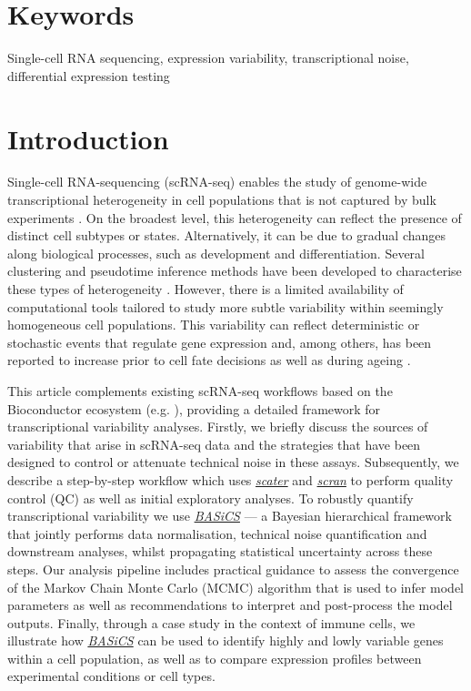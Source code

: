\documentclass[9pt,a4paper,]{extarticle}
\begin{document}
\section*{Keywords}
Single-cell RNA sequencing, expression variability, transcriptional noise, differential expression testing


\clearpage
\pagestyle{main}

\hypertarget{introduction}{%
\section{Introduction}\label{introduction}}

Single-cell RNA-sequencing (scRNA-seq) enables the study of genome-wide
transcriptional heterogeneity in cell populations that is not
captured by bulk experiments \citep{Stegle2015, Prakadan2017, Patange2018}.
On the broadest level, this heterogeneity can reflect the presence of distinct
cell subtypes or states.
Alternatively, it can be due to gradual changes along biological processes,
such as development and differentiation.
Several clustering and pseudotime inference methods have been developed to
characterise these types of heterogeneity \citep{Kiselev2019, Saelens2019}.
However, there is a limited availability of computational tools tailored
to study more subtle variability within seemingly homogeneous cell populations.
This variability can reflect deterministic or stochastic events that regulate
gene expression and, among others, has been reported to increase prior to cell
fate decisions \citep{Mojtahedi2016} as well as during ageing \citep{Martinez-jimenez2017}.

This article complements existing scRNA-seq workflows based on the Bioconductor
ecosystem (e.g. \citep{Lun2016, Kim2019}), providing a detailed framework for
transcriptional variability analyses.
Firstly, we briefly discuss the sources of variability that arise in scRNA-seq
data and the strategies that have been designed to control or attenuate
technical noise in these assays.
Subsequently, we describe a step-by-step workflow which uses
\emph{\href{https://bioconductor.org/packages/3.11/scater}{scater}} \citep{McCarthy2017} and \emph{\href{https://bioconductor.org/packages/3.11/scran}{scran}} \citep{Lun2016}
to perform quality control (QC) as well as initial exploratory analyses.
To robustly quantify transcriptional variability we use \emph{\href{https://bioconductor.org/packages/3.11/BASiCS}{BASiCS}}
\citep{Vallejos2015, Vallejos2016, Eling2017} --- a Bayesian hierarchical framework
that jointly performs data normalisation, technical noise quantification and
downstream analyses, whilst propagating statistical uncertainty across these
steps.
Our analysis pipeline includes practical guidance to assess the convergence of
the Markov Chain Monte Carlo (MCMC) algorithm that is used to infer model
parameters as well as recommendations to interpret and post-process the model
outputs.
Finally, through a case study in the context of immune cells, we illustrate
how \emph{\href{https://bioconductor.org/packages/3.11/BASiCS}{BASiCS}} can be used to identify highly and lowly variable
genes within a cell population, as well as to compare expression profiles
between experimental conditions or cell types.
\end{document}
